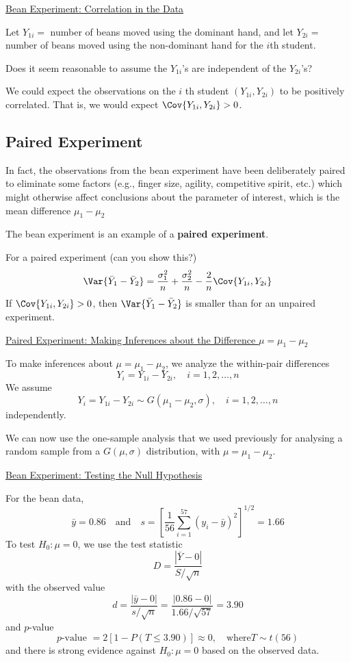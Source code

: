 \documentclass[oneside]{book}
\begin{document}
\underline{Bean Experiment: Correlation in the Data}

Let $ Y_{1i}= $ number of beans moved using the dominant hand, and let $ Y_{2i}= $
number of beans moved using the non-dominant hand for the $ i $th student.

Does it seem reasonable to assume the $ Y_{1i} $'s are independent of the $ Y_{2i} $'s?

We could expect the observations on the $i$ th student
$\left(Y_{1 i}, Y_{2 i}\right)$ to be positively correlated.
That is, we would expect $\Cov{Y_{1 i}, Y_{2 i}}>0$.

\subsection{Paired Experiment}
In fact, the observations from the bean experiment have been deliberately paired to eliminate some factors
(e.g., finger size, agility, competitive spirit, etc.) which might otherwise affect conclusions about the parameter of interest, which is the mean difference $\mu_{1}-\mu_{2}$

The bean experiment is an example of a \textbf{paired experiment}.

For a paired experiment (can you show this?)
\[ \Var{\bar{Y}_{1}-\bar{Y}_{2}}
    =\frac{\sigma_{1}^{2}}{n}+\frac{\sigma_{2}^{2}}{n}-\frac{2}{n} \Cov{Y_{1 i}, Y_{2 i}} \]
If
$\Cov{Y_{1 i}, Y_{2 i}}>0 $,
then $\Var{\bar{Y}_{1}-\bar{Y}_{2}}$ is smaller than for an unpaired experiment.

\underline{Paired Experiment: Making Inferences about the Difference $ \mu=\mu_1-\mu_2 $}

To make inferences about $\mu=\mu_{1}-\mu_{2}$, we analyze the within-pair differences
\[Y_{i}=Y_{1 i}-Y_{2 i}, \quad i=1,2, \ldots, n\]
We assume
\[ Y_{i}=Y_{1 i}-Y_{2 i} \sim G\left(\mu_{1}-\mu_{2}, \sigma\right), \quad i=1,2, \ldots, n \]
independently.

We can now use the one-sample analysis that we used previously for analysing
a random sample from a $G(\mu, \sigma)$ distribution, with $\mu=\mu_{1}-\mu_{2}$.

\underline{Bean Experiment: Testing the Null Hypothesis}

For the bean data,
\[ \bar{y}=0.86 \quad \text{and} \quad s=\left[\frac{1}{56} \sum_{i=1}^{57}\left(y_{i}-\bar{y}\right)^{2}\right]^{1 / 2}=1.66 \]
To test $ H_0:\mu=0 $, we use the test statistic
\[D=\frac{|\bar{Y}-0|}{S / \sqrt{n}}\]
with the observed value
\[d=\frac{|\bar{y}-0|}{s / \sqrt{n}}=\frac{|0.86-0|}{1.66 / \sqrt{57}}=3.90\]
and $p$-value
\[p \text{-value }=2[1-P(T \leq 3.90)] \approx 0, \quad \text{where} T \sim t(56)\]
and there is strong evidence against $H_{0}: \mu=0$ based on the observed data.
\end{document}
